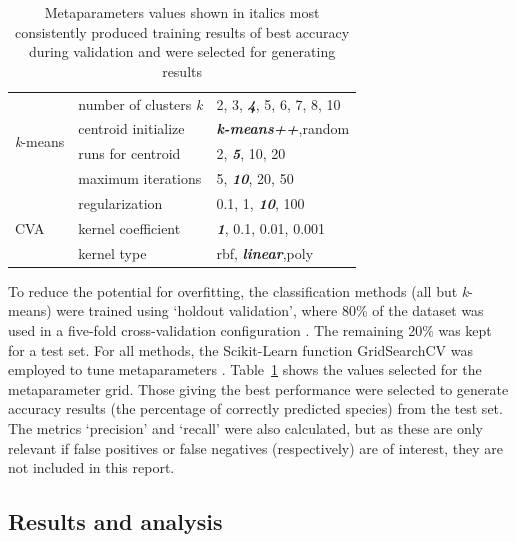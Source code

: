 \documentclass[a4paper, 11pt]{article}
\begin{document}
\begin{table}
\begin{center}
\begin{tabular}{l|l|l}
  \hline
  \multirow{4}{*}{\textit{k}-means} & number of clusters \textit{k}  & 2, 3, \textit{\textbf{4}}, 5, 6, 7, 8, 10\\
                                    & centroid initialize         & \textit{\textbf{k-means++}},random\\
                                    & runs for centroid	     & 2, \textit{\textbf{5}}, 10, 20 \\
                                    & maximum iterations           & 5, \textit{\textbf{10}}, 20, 50 \\
  \hline
    \multirow{3}{*}{CVA}            & regularization   & 0.1, 1, \textit{\textbf{10}}, 100 \\
                                    & kernel coefficient      & \textit{\textbf{1}}, 0.1, 0.01, 0.001 \\
                                    & kernel type                  & rbf, \textit{\textbf{linear}},poly \\
  \hline
  \end{tabular}
  \vspace{-2\baselineskip} %
  \end{center} 
  \caption{\centering\linespread{0.8}\selectfont Metaparameters values shown in italics most consistently produced training results of 
  best accuracy during validation and were selected for generating results}
  \vspace{-1\baselineskip} %
  \label{tab:metaparameters}
\end{table} 

To reduce the potential for overfitting, the classification methods (all but \textit{k}-means) were trained using 
`holdout validation', where 80\% of the dataset was used in a five-fold cross-validation 
configuration \cite{james2013introduction}. The remaining 20\% was kept for a test set. For all methods, 
the Scikit-Learn function GridSearchCV was employed to tune metaparameters \cite{scikit-learn}. 
Table~\ref{tab:metaparameters} shows the values selected for the metaparameter grid. Those giving the best 
performance were selected to generate accuracy results (the percentage of correctly predicted species) 
from the test set. The metrics `precision' and `recall' were also calculated, but as 
these are only relevant if false positives or false negatives (respectively) are of interest, 
they are not included in this report.


\subsection*{Results and analysis}
\end{document}
